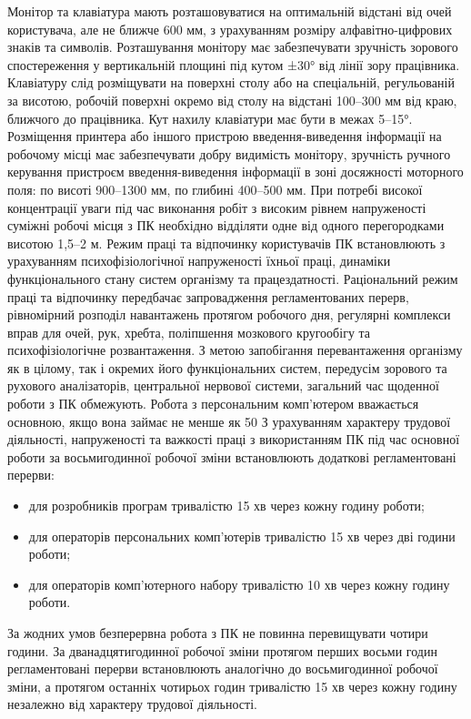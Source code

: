 \documentclass[12pt,a4paper]{article}
\begin{document}
Монітор та клавіатура мають розташовуватися на оптимальній відстані від очей користувача, але не ближче 600 мм, з урахуванням розміру алфавітно-цифрових знаків та символів.
Розташування монітору має забезпечувати зручність зорового спостереження у вертикальній площині під кутом ±30° від лінії зору працівника.
Клавіатуру слід розміщувати на поверхні столу або на спеціальній, регульованій за висотою, робочій поверхні окремо від столу на відстані 100–300 мм від краю, ближчого до працівника. Кут нахилу клавіатури має бути в межах 5–15°.
Розміщення принтера або іншого пристрою введення-виведення інформації на робочому місці має забезпечувати добру видимість монітору, зручність ручного керування пристроєм введення-виведення інформації в зоні досяжності моторного поля: по висоті 900–1300 мм, по глибині 400–500 мм.
При потребі високої концентрації уваги під час виконання робіт з високим рівнем напруженості суміжні робочі місця з ПК необхідно відділяти одне від одного перегородками висотою 1,5–2 м.
Режим праці та відпочинку користувачів ПК встановлюють з урахуванням психофізіологічної напруженості їхньої праці, динаміки функціонального стану систем організму та працездатності. Раціональний режим праці та відпочинку передбачає запровадження регламентованих перерв, рівномірний розподіл навантажень протягом робочого дня, регулярні комплекси вправ для очей, рук, хребта, поліпшення мозкового кругообігу та психофізіологічне розвантаження.
З метою запобігання перевантаження організму як в цілому, так і окремих його функціональних систем, передусім зорового та рухового аналізаторів, центральної нервової системи, загальний час щоденної роботи з ПК обмежують. Робота з персональним комп’ютером вважається основною, якщо вона займає не менше як 50 %
З урахуванням характеру трудової діяльності, напруженості та важкості праці з використанням ПК під час основної роботи за восьмигодинної робочої зміни встановлюють додаткові регламентовані перерви:
\begin{itemize}
\item для розробників програм тривалістю 15 хв через кожну годину роботи;
\item для операторів персональних комп’ютерів тривалістю 15 хв через дві години роботи;
\item для операторів комп’ютерного набору тривалістю 10 хв через кожну годину роботи.
\end{itemize}
За жодних умов безперервна робота з ПК не повинна перевищувати чотири години.
За дванадцятигодинної робочої зміни протягом перших восьми годин регламентовані перерви встановлюють аналогічно до восьмигодинної робочої зміни, а протягом останніх чотирьох годин тривалістю 15 хв через кожну годину незалежно від характеру трудової діяльності.
\end{document}
